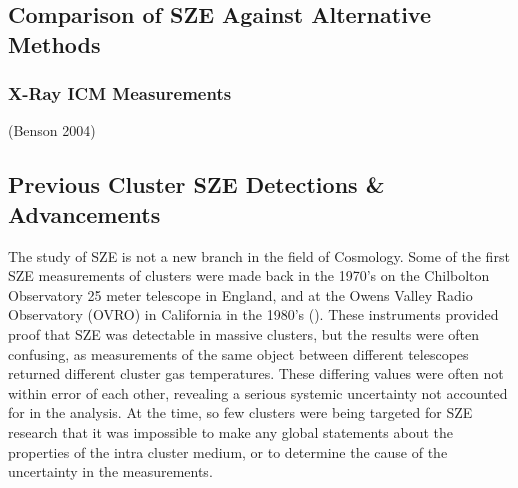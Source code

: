\documentclass[manuscript]{aastex}
\begin{document}
\subsection{Comparison of SZE Against Alternative Methods}


\subsubsection{X-Ray ICM Measurements}

(Benson 2004)




\subsection{Previous Cluster SZE Detections \& Advancements}

The study of SZE is not a new branch in the field of Cosmology. Some of the first SZE measurements of clusters were made back in the 1970's on the Chilbolton Observatory 25 meter telescope in England, and at the Owens Valley Radio Observatory (OVRO) in California in the 1980's (\cite{Birkinshaw1999}). These instruments provided proof that SZE was detectable in massive clusters, but the results were often confusing, as measurements of the same object between different telescopes returned different cluster gas temperatures. These differing values were often not within error of each other, revealing a serious systemic uncertainty not accounted for in the analysis. At the time, so few clusters were being targeted for SZE research that it was impossible to make any global statements about the properties of the intra cluster medium, or to determine the cause of the uncertainty in the measurements. 
\end{document}
